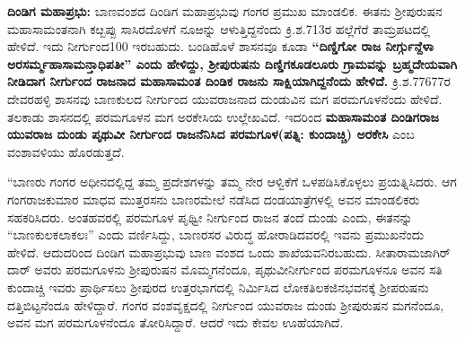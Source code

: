 \vskip 2pt

\textbf{ದಿಂಡಿಗ ಮಹಾಪ್ರಭು:} ಬಾಣವಂಶದ ದಿಂಡಿಗ ಮಹಾಪ್ರಭುವು ಗಂಗರ ಪ್ರಮುಖ ಮಾಂಡಲಿಕ. ಈತನು ಶ‍್ರೀಪುರುಷನ ಮಹಾಸಾಮಂತನಾಗಿ ಕೞ್ಬಪ್ಪು ಸಾಸಿರದೊಳಗೆ ನೂಱನ್ನು ಆಳುತ್ತಿದ್ದನೆಂದು ಕ್ರಿ.ಶ.713ರ ಹಲ್ಲೆಗೆರೆ ತಾಮ್ರಪಟದಲ್ಲಿ ಹೇಳಿದೆ. ಇದು ನೀರ್ಗುಂದ100 ಇರಬಹುದು. ಬಂಡಿಹೊಳೆ ಶಾಸನವೂ ಕೂಡಾ \textbf{“ದಿಣ್ಡಿಗೋ ರಾಜ ನೀರ್ಗ್ಗುನ್ದೆಳಾ ಅರಸರ್ಮ್ಮಹಾಸಾಮನ್ತಾಧಿಪತೀ” ಎಂದು ಹೇಳಿದ್ದು, ಶ‍್ರೀಪುರುಷನು ದಿಣ್ಡಿಗಕೂಡಲೂರು ಗ್ರಾಮವನ್ನು ಬ್ರಹ್ಮದೇಯವಾಗಿ ನೀಡಿದಾಗ ನೀರ್ಗುಂದ ರಾಜನಾದ ಮಹಾಸಾಮಂತ ದಿಂಡಿಕ ರಾಜನು ಸಾಕ್ಷಿಯಾಗಿದ್ದನೆಂದು ಹೇಳಿದೆ.} ಕ್ರಿ.ಶ.776\enginline{-}77ರ ದೇವರಹಳ್ಳಿ ಶಾಸನವು ಬಾಣಕುಲದ ನೀರ್ಗುಂದ ಯುವರಾಜನಾದ ದುಂಡುವಿನ ಮಗ ಪರಮಗೂಳನೆಂದು ಹೇಳಿದೆ. ತಲಕಾಡು ಶಾಸನದಲ್ಲಿ ಪರಮಗೂಳನ ಮಗ ಅರಕೇಸಿಯ ಉಲ್ಲೇಖವಿದೆ. ಇದರಿಂದ \textbf{ಮಹಾಸಾಮಂತ ದಿಂಡಿಗರಾಜ\general{\enginline{-}} ಯುವರಾಜ ದುಂಡು\general{\enginline{-}} ಪೃಥುವೀ ನೀರ್ಗುಂದ ರಾಜನೆನಿಸಿದ ಪರಮಗೂಳ(ಪತ್ನಿ: ಕುಂದಾಚ್ಚಿ)\general{\enginline{-}} ಅರಕೇಸಿ} ಎಂಬ ವಂಶಾವಳಿಯು ಹೊರಡುತ್ತದೆ.

\vskip 2pt

“ಬಾಣರು ಗಂಗರ ಅಧೀನದಲ್ಲಿದ್ದ ತಮ್ಮ ಪ್ರದೇಶಗಳನ್ನು ತಮ್ಮ ನೇರ ಆಳ್ವಿಕೆಗೆ ಒಳಪಡಿಸಿಕೊಳ್ಳಲು ಪ್ರಯತ್ನಿಸಿದರು. ಆಗ ಗಂಗರಾಜಕುಮಾರ ಮಾಧವ ಮುತ್ತರಸನು ಬಾಣರಮೇಲೆ ನಡೆಸಿದ ದಂಡಯಾತ್ರೆಗಳಲ್ಲಿ ಅವನ ಮಾಂಡಲಿಕರು ಸಹಕರಿಸಿದರು. ಅಂತಹವರಲ್ಲಿ ಪರಮಗೂಳ ಪೃಥ್ವೀ ನೀರ್ಗುಂದ ರಾಜನ ತಂದೆ ದುಂಡು ಎಂದು, ಈತನನ್ನು “ಬಾಣಕುಲ\-ಕಲಾಕಲಃ” ಎಂದು ವರ್ಣಿಸಿದ್ದು, ಬಾಣರಸರ ವಿರುದ್ಧ ಹೋರಾಡಿದವರಲ್ಲಿ ಇವನು ಪ್ರಮುಖನೆಂದು ಹೇಳಿದೆ. ಆದುದರಿಂದ ದಿಂಡಿಗ ಮಹಾಪ್ರಭುವು ಬಾಣ ವಂಶದ ಒಂದು ಶಾಖೆಯವನಿರಬಹುದು. ಸೀತಾರಾಮಜಾಗಿರ್​ದಾರ್​ ಅವರು ಪರಮಗೂಳನು ಶ‍್ರೀಪುರುಷನ ಮೊಮ್ಮಗನೆಂದೂ, ಪೃಥುವೀನೀರ್ಗುಂದ ಪರಮಗೂಳನೂ ಅವನ ಸತಿ ಕುಂದಾಚ್ಚಿ ಇವರು ಪ್ರಾರ್ಥಿಸಲು ಶ‍್ರೀಪುರದ ಉತ್ತರಭಾಗದಲ್ಲಿ ನಿರ್ಮಿಸಿದ ಲೋಕತಿಲಕಜಿನಭವನಕ್ಕೆ ಶ‍್ರೀಪರುಷನು ದತ್ತಿಬಿಟ್ಟನೆಂದೂ ಹೇಳಿದ್ದಾರೆ. ಗಂಗರ ವಂಶವೃಕ್ಷದಲ್ಲಿ ನೀರ್ಗುಂದ ಯುವರಾಜ ದುಂಡು ಶ‍್ರೀಪುರುಷನ ಮಗನೆಂದೂ, ಅವನ ಮಗ ಪರಮಗೂಳನೆಂದೂ ತೋರಿಸಿದ್ದಾರೆ. ಆದರೆ ಇದು ಕೇವಲ ಊಹೆಯಾಗಿದೆ.

\vskip 2pt

